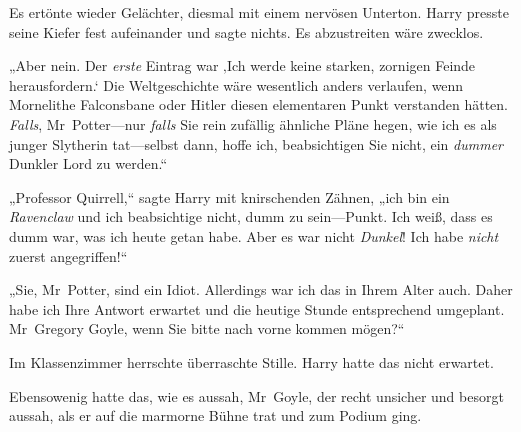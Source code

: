 Es ertönte wieder Gelächter, diesmal mit einem nervösen Unterton. Harry presste seine Kiefer fest aufeinander und sagte nichts. Es abzustreiten wäre zwecklos.

„Aber nein. Der \emph{erste} Eintrag war ‚Ich werde keine starken, zornigen Feinde herausfordern.‘ Die Weltgeschichte wäre wesentlich anders verlaufen, wenn Mornelithe Falconsbane oder Hitler diesen elementaren Punkt verstanden hätten. \emph{Falls}, Mr~Potter—nur \emph{falls} Sie rein zufällig ähnliche Pläne hegen, wie ich es als junger Slytherin tat—selbst dann, hoffe ich, beabsichtigen Sie nicht, ein \emph{dummer} Dunkler Lord zu werden.“

„Professor Quirrell,“ sagte Harry mit knirschenden Zähnen, „ich bin ein \emph{Ravenclaw} und ich beabsichtige nicht, dumm zu sein—Punkt. Ich weiß, dass es dumm war, was ich heute getan habe. Aber es war nicht \emph{Dunkel}! Ich habe \emph{nicht} zuerst angegriffen!“

„Sie, Mr~Potter, sind ein Idiot. Allerdings war ich das in Ihrem Alter auch. Daher habe ich Ihre Antwort erwartet und die heutige Stunde entsprechend umgeplant. Mr~Gregory Goyle, wenn Sie bitte nach vorne kommen mögen?“

Im Klassenzimmer herrschte überraschte Stille. Harry hatte das nicht erwartet.

Ebensowenig hatte das, wie es aussah, Mr~Goyle, der recht unsicher und besorgt aussah, als er auf die marmorne Bühne trat und zum Podium ging.

